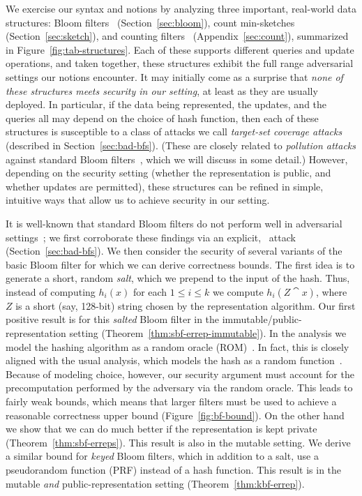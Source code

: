 We exercise our syntax and notions by analyzing three important, real-world data
structures: Bloom filters~\cite{bloom1970space} (Section~\ref{sec:bloom}), count
min-sketches~\cite{cormode2005improved} (Section~\ref{sec:sketch}), and counting
filters~\cite{fan2000summary} (Appendix~\ref{sec:count}), summarized in
Figure~\ref{fig:tab-structures}. Each of these supports different queries and
update operations, and taken together, these structures exhibit the full range
adversarial settings our notions encounter. It may initially come as a surprise
that \emph{none of these structures meets security in our setting}, at least as
they are usually deployed. In particular, if the data being represented,
the updates, and the queries all may depend on the choice of hash function, then each of
these structures is susceptible to a class of attacks we call \emph{target-set
coverage attacks} (described in Section~\ref{sec:bad-bfs}). (These are closely
related to \emph{pollution attacks} against standard Bloom
filters~\cite{gerbet2015power}, which we will discuss in some detail.)
%
However, depending on the security setting (whether the representation is
public, and whether updates are permitted), these structures can be refined in
simple, intuitive ways that allow us to achieve security in our setting.

%
It is well-known that standard Bloom filters do not perform well in adversarial
settings~\cite{naor2015bloom,gerbet2015power}; we first corroborate these
findings via an explicit, \erreps\ attack (Section~\ref{sec:bad-bfs}).
%
We then consider the security of several variants of the basic Bloom
filter for which we can derive correctness bounds.
%
The first idea is to generate a short, random \emph{salt}, which we prepend to
the input of the hash. Thus, instead of computing $h_i(x)$ for each $1\leq i
\leq k$ we compute $h_i(Z \cat x)$, where~$Z$ is a short (say, 128-bit) string
chosen by the representation algorithm.
%
Our first positive result is for this \emph{salted} Bloom filter in the
immutable/public-representation setting (Theorem~\ref{thm:sbf-errep-immutable}).
%
In the analysis we model the hashing algorithm as a random oracle
(ROM)~\cite{BR93}. In fact, this is closely aligned with the usual analysis,
which models the hash as a random function~\cite{broder2004network}. Because of
modeling choice, however, our security argument must account for the
precomputation performed by the adversary via the random oracle. This leads to
fairly weak bounds, which means that larger filters must be used to achieve a
reasonable correctness upper bound (Figure~\ref{fig:bf-bound}). On the other
hand we show that we can do much better if the representation is kept private
(Theorem~\ref{thm:sbf-erreps}). This result is also in the mutable setting.
%
We derive a similar bound for \emph{keyed} Bloom filters, which in addition to a
salt, use a pseudorandom function (PRF) instead of a hash function. This result is
in the mutable \emph{and} public-representation setting
(Theorem~\ref{thm:kbf-errep}).

